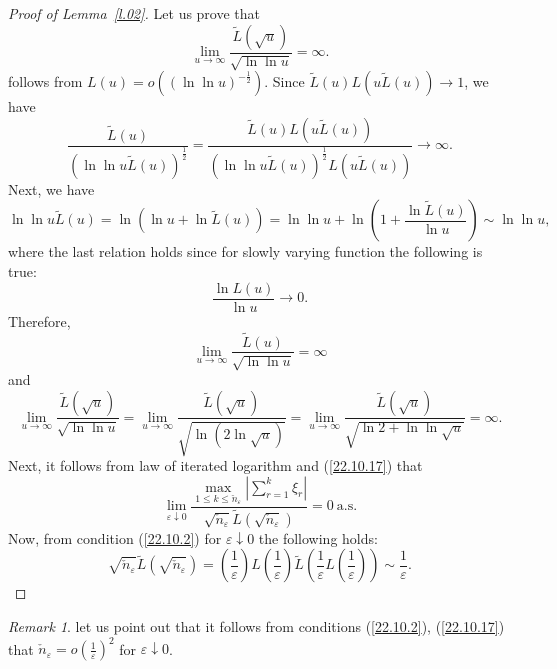 \documentclass{article}
\theoremstyle{plain}
\theoremstyle{definition}
\theoremstyle{remark}
\newtheorem{remark}[theorem]{Remark}
\newcommand{\ra }{ \rightarrow} %
\newcommand{\beq}{\begin{equation}}
\newcommand{\eeq}{\end{equation}}
\begin{document}
\begin{proof}[Proof of Lemma~\ref{l.02}]
Let us prove that 
\beq\label{22.10.17}
\lim\limits_{u\rightarrow\infty}\frac{\widetilde{L}(\sqrt{u})}{\sqrt{\ln\ln u}}=\infty.
\eeq
follows from $L(u) = o\left( (\ln \ln u)^{-\frac{1}{2}}\right)$. Since $\widetilde{L}(u) L(u \widetilde{L}(u)) \ra 1$, we have
$$
\frac{\widetilde{L}(u)}{(\ln \ln u\widetilde{L}(u))^{\frac{1}{2}}} = \frac{\widetilde{L}(u) L(u \widetilde{L}(u))}{(\ln \ln u\widetilde{L}(u))^{\frac{1}{2}} L(u \widetilde{L}(u)) } \ra \infty.$$
Next, we have
\begin{equation*}
    \ln \ln u\widetilde{L}(u) =  \ln \left(\ln u + \ln \widetilde{L}(u)\right) = \ln \ln u + \ln \left(1 + \frac{\ln \widetilde{L}(u)}{\ln u}\right)  \sim \ln\ln u,
\end{equation*}
where the last relation holds since for slowly varying function the following is true: 
\begin{equation*}
   \frac{\ln L(u)}{\ln u} \ra 0. 
\end{equation*}
Therefore,
$$
\lim\limits_{u\rightarrow\infty}\frac{\widetilde{L}(u)}{\sqrt{\ln\ln u}}=\infty
$$
and
$$
\lim\limits_{u\rightarrow\infty}\frac{\widetilde{L}(\sqrt{u})}{\sqrt{\ln\ln u}}= \lim\limits_{u\rightarrow\infty}\frac{\widetilde{L}(\sqrt{u})}{\sqrt{\ln \left(2\ln \sqrt{u}\right)}} =  \lim\limits_{u\rightarrow\infty}\frac{\widetilde{L}(\sqrt{u})}{\sqrt{\ln 2 + \ln\ln \sqrt{u}}} = \infty.
$$
Next, it follows from law of iterated logarithm and (\ref{22.10.17}) that
$$
\lim\limits_{\varepsilon\downarrow 0}
\frac{\max\limits_{1\leqslant k \leqslant \check{n}_\varepsilon}\left|\sum\limits_{r=1}^k\xi_r\right|}{\sqrt{\check{n}_\varepsilon}\widetilde{L}(\sqrt{\check{n}_\varepsilon})}=0 \ \text{a.s.}
$$
Now, from condition (\ref{22.10.2}) for $\varepsilon\downarrow 0$ the following holds:
\begin{equation}
\sqrt{\check{n}_\varepsilon}\widetilde{L}(\sqrt{\check{n}_\varepsilon})
=\left(\frac{1}{\varepsilon}\right)L\left(\frac{1}{\varepsilon}\right)
\widetilde{L}\left(\frac{1}{\varepsilon}L\left(\frac{1}{\varepsilon}\right)\right) \sim \frac{1}{\varepsilon}. \label{L.A7_eq2}
\end{equation}
\end{proof}

\begin{remark} \label{r.1} let us point out that it follows from conditions (\ref{22.10.2}), (\ref{22.10.17}) that $\check{n}_\varepsilon=o\left(\frac{1}{\varepsilon}\right)^2$ for  $\varepsilon\downarrow 0$.
\end{remark}
\end{document}
